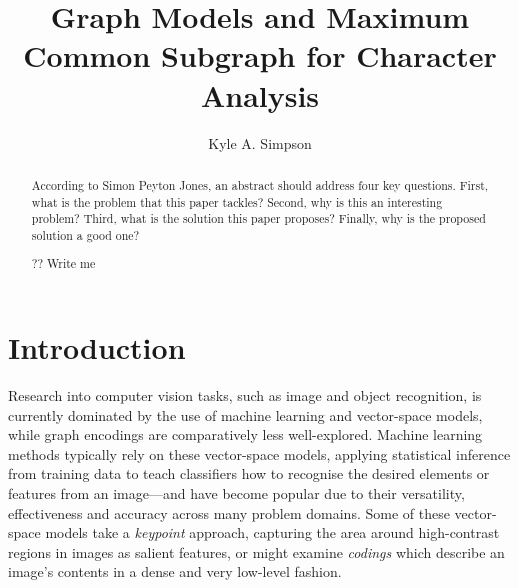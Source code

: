 \documentclass{mpaper}
\begin{document}
\title{Graph Models and Maximum Common Subgraph for Character Analysis}
\author{Kyle A. Simpson}

\maketitle
\begin{abstract}
According to Simon Peyton Jones, an abstract should address
four key questions. First, what is the problem that this
paper tackles? Second, why is this an interesting problem?
Third, what is the solution this paper proposes?
Finally, why is the proposed solution a good one?

?? Write me
\end{abstract}

\section{Introduction}
\label{sec:introduction}

Research into computer vision tasks, such as image and object recognition, is currently dominated by the use of machine learning and vector-space models, while graph encodings are comparatively less well-explored.
Machine learning methods typically rely on these vector-space models, applying statistical inference from training data to teach classifiers how to recognise the desired elements or features from an image---and have become popular due to their versatility, effectiveness and accuracy across many problem domains.
Some of these vector-space models take a \emph{keypoint} approach, capturing the area around high-contrast regions in images as salient features, or might examine \emph{codings} which describe an image's contents in a dense and very low-level fashion.
\end{document}
